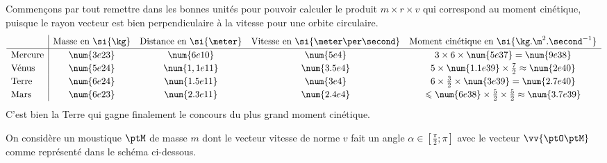 
\begin{corrige}
	Commençons par tout remettre dans les bonnes unités pour pouvoir calculer le produit $m\times r\times v$ qui correspond au moment cinétique, puisque le rayon vecteur est bien perpendiculaire à la vitesse pour une orbite circulaire.
	\[
		\renewcommand{\arraystretch}{1.2}
		\begin{array}{l|cccc}
				&	\text{Masse en }\si{\kg}	&	\text{Distance en }\si{\meter}	&	\text{Vitesse en }\si{\meter\per\second}
				&	\text{Moment cinétique en }\si{\kg. \m^2.\second^{-1}}
				\\ \hline
			\text{Mercure}
				&	\num{3e23}
				&	\num{6e10}
				&	\num{5e4}
				&	3\times6\times\num{5e37} = \num{9e38}\\
			\text{Vénus}
				&	\num{5e24}
				&	\num{1,1e11}
				&	\num{3.5e4}
				&	5\times\num{1.1e39}\times\frac72
					\approx \num{2e40}\\
			\text{Terre}
				&	\num{6e24}
				&	\num{1.5e11}
				&	\num{3e4}
				&	6\times \frac32 \times \num{3e39}
					= \num{2.7e40}\\
			\text{Mars}
				&	\num{6e23}
				&	\num{2.3e11}
				&	\num{2.4e4}
				& \leqslant \num{6e38}\times\frac{5}{2}\times\frac{5}{2} \approx \num{3.7e39}
		\end{array}
		\renewcommand{\arraystretch}{1}
	\]
	C'est bien la Terre qui gagne finalement le concours du plus grand moment cinétique.
\end{corrige}


\finEntrainement







\hauteurLargeurCadreReponse		{8mm}{3.5cm}
\typeEntrainement				{} %
\initialisationEntrainement

On considère un moustique $\ptM$ de masse $m$ dont le vecteur vitesse de norme $v$ fait un angle $\alpha\in\left[\frac{\pi}{2};\pi\right]$ avec le vecteur $\vv{\ptO\ptM}$ comme représenté dans le schéma ci-dessous.

